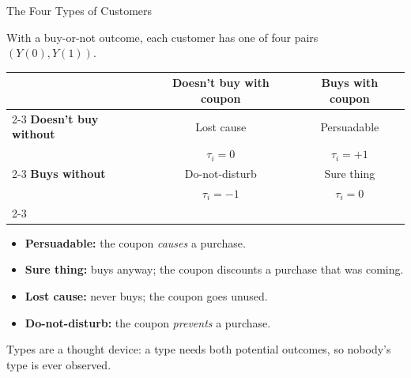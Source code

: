 \documentclass[aspectratio=169, 11pt, handout]{beamer}
\begin{document}
\begin{frame}{The Four Types of Customers}

With a buy-or-not outcome, each customer has one of four pairs $(Y(0), Y(1))$.

\bigskip

\begin{center}
\begin{tabular}{l|c|c|}
\multicolumn{1}{c}{} & \multicolumn{1}{c}{\textbf{Doesn't buy with coupon}} & \multicolumn{1}{c}{\textbf{Buys with coupon}} \\
\cline{2-3}
\textbf{Doesn't buy without} & \cellcolor{gray!15} Lost cause & \cellcolor{green!15} Persuadable \\
& $\tau_i = 0$ & $\tau_i = +1$ \\
\cline{2-3}
\textbf{Buys without} & \cellcolor{red!15} Do-not-disturb & \cellcolor{blue!10} Sure thing \\
& $\tau_i = -1$ & $\tau_i = 0$ \\
\cline{2-3}
\end{tabular}
\end{center}

\bigskip

\begin{itemize}
    \item \textbf{Persuadable:} the coupon \emph{causes} a purchase.
    \item \textbf{Sure thing:} buys anyway; the coupon discounts a purchase that was coming.
    \item \textbf{Lost cause:} never buys; the coupon goes unused.
    \item \textbf{Do-not-disturb:} the coupon \emph{prevents} a purchase.
\end{itemize}

\small Types are a thought device: a type needs both potential outcomes, so nobody's type is ever observed.
\end{frame}
\end{document}

